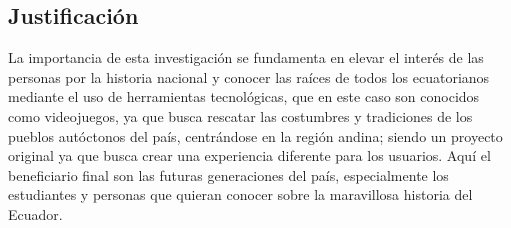 \documentclass[a4paper, openright, 12pt]{report}
\begin{document}
\subsection{Justificación}
\justify
La importancia de esta investigación se fundamenta en elevar el interés de las personas por la historia nacional y conocer las raíces de todos los ecuatorianos mediante el uso de herramientas tecnológicas, que en este caso son conocidos como videojuegos, ya que busca rescatar las costumbres y tradiciones de los pueblos autóctonos del país, centrándose en la región andina; siendo un proyecto original ya que busca crear una experiencia diferente para los usuarios. Aquí el beneficiario final son las futuras generaciones del país, especialmente los estudiantes y personas que quieran conocer sobre la maravillosa historia del Ecuador.
\end{document}
